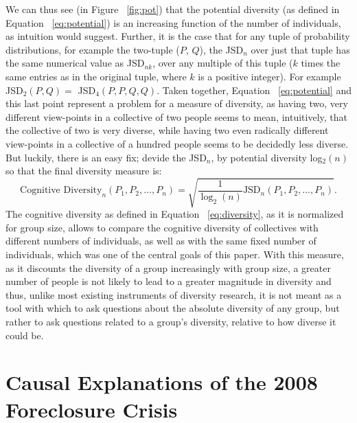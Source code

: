 \documentclass[12pt]{article}
\begin{document}
We can thus see (in Figure ~\ref{fig:pot}) that the potential diversity (as defined in Equation ~\ref{eq:potential}) is an increasing function of the number of individuals, as intuition would suggest.
Further, it is the case that for any tuple of probability distributions, for example the two-tuple ($P$, $Q$), the JSD$_n$ over just that tuple has the same numerical value as JSD$_{nk}$, over any multiple of this tuple ($k$ times the same entries as in the original tuple, where $k$ is a positive integer). For example JSD$_2(P, Q)=$ JSD$_4(P, P, Q, Q)$. Taken together, Equation ~\ref{eq:potential} and this last point represent a problem for a measure of diversity, as having two, very different view-points in a collective of two people seems to mean, intuitively, that the collective of two is very diverse, while having two even radically different view-points in a collective of a hundred people seems to be decidedly less diverse. But luckily, there is an easy fix; devide the JSD$_n$, by potential diversity log$_2(n)$ so that the final diversity measure is:
\begin{equation} \label{eq:diversity}
\text{Cognitive Diversity}_n(P_1, P_2, \ldots, P_n)=\sqrt{\frac{1}{\log_2(n)}\text{JSD}_n(P_1, P_2, \ldots, P_n)}.
\end{equation}
The cognitive diversity as defined in Equation ~\ref{eq:diversity}, as it is normalized for group size, allows to compare the cognitive diversity of collectives with different numbers of individuals, as well as with the same fixed number of individuals, which was one of the central goals of this paper. With this measure, as it discounts the diversity of a group increasingly with group size, a greater number of people is not likely to lead to a greater magnitude in diversity and thus, unlike most existing instruments of diversity research, it is not meant as a tool with which to ask questions about the absolute diversity of any group, but rather to ask questions related to a group's diversity, relative to how diverse it could be.

\section{Causal Explanations of the 2008 Foreclosure Crisis}
\end{document}
